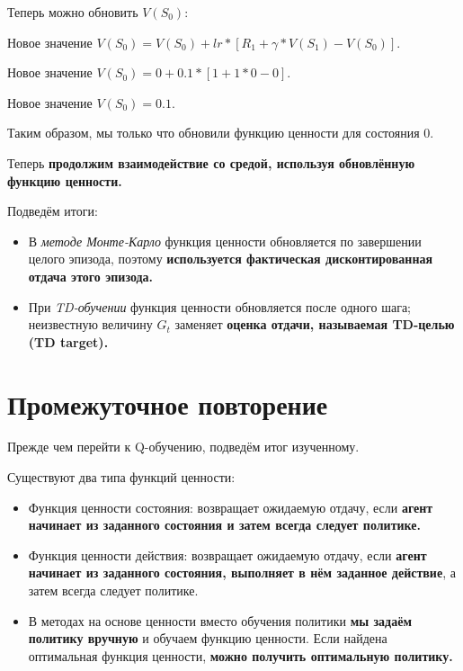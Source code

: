 \documentclass[11pt,a4paper]{article}
\begin{document}

Теперь можно обновить \(V(S_0)\):

Новое значение \(V(S_0) = V(S_0) + lr * [R_1 + \gamma * V(S_1) - V(S_0)]\).

Новое значение \(V(S_0) = 0 + 0.1 * [1 + 1 * 0-0]\).

Новое значение \(V(S_0) = 0.1\).

Таким образом, мы только что обновили функцию ценности для состояния 0.

Теперь \textbf{продолжим взаимодействие со средой, используя обновлённую функцию ценности.}


Подведём итоги:

\begin{itemize}
\tightlist
\item
  В \emph{методе Монте-Карло} функция ценности обновляется по завершении целого эпизода, поэтому \textbf{используется фактическая дисконтированная отдача этого эпизода.}
\item
  При \emph{TD-обучении} функция ценности обновляется после одного шага; неизвестную величину \(G_t\) заменяет \textbf{оценка отдачи, называемая TD-целью (TD target).}
\end{itemize}


\section{Промежуточное повторение}\label{mid-way-recap}

Прежде чем перейти к Q-обучению, подведём итог изученному.

Существуют два типа функций ценности:

\begin{itemize}
\tightlist
\item
  Функция ценности состояния: возвращает ожидаемую отдачу, если \textbf{агент начинает из заданного состояния и затем всегда следует политике.}
\item
  Функция ценности действия: возвращает ожидаемую отдачу, если \textbf{агент начинает из заданного состояния, выполняет в нём заданное действие}, а затем всегда следует политике.
\item
  В методах на основе ценности вместо обучения политики \textbf{мы задаём политику вручную} и обучаем функцию ценности. Если найдена оптимальная функция ценности, \textbf{можно получить оптимальную политику.}
\end{itemize}
\end{document}
